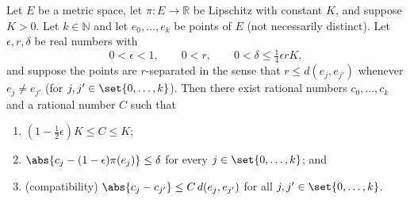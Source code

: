 \begin{lemma}
  Let $E$ be a metric space, let $\pi \colon E \to \mathbb{R}$ be Lipschitz with constant $K$, and
  suppose $K > 0$. Let $k \in \mathbb{N}$ and let $e_0,\dots,e_k$ be points of $E$ (not necessarily
  distinct). Let $\epsilon, r, \delta$ be real numbers with
  \[
    0 < \epsilon < 1
    ,\qquad
    0 < r
    ,\qquad
    0 < \delta \le \tfrac{1}{4}\epsilon r K
    ,
  \]
  and suppose the points are $r$-separated in the sense that $r \le d(e_j,e_{j'})$ whenever $e_j \ne
  e_{j'}$ (for $j,j' \in \set{0,\dots,k}$). Then there exist rational numbers $c_0,\dots,c_k$ and a
  rational number $C$ such that
  \begin{enumerate}
  \item $(1 - \tfrac12\epsilon) K \le C \le K$;
  \item $\abs{c_j - (1-\epsilon)\pi(e_j)} \le \delta$ for every $j \in \set{0,\dots,k}$; and
  \item (compatibility) $\abs{c_j - c_{j'}} \le C\,d(e_j,e_{j'})$ for all $j,j' \in
    \set{0,\dots,k}$.
  \end{enumerate}
\end{lemma}

